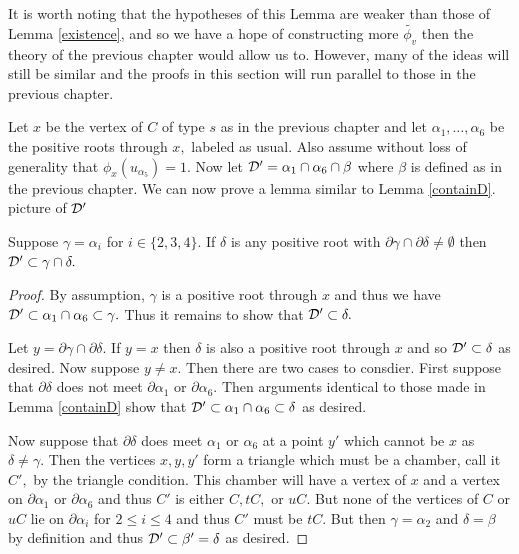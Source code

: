 \documentclass[class=book, crop=false]{standalone}
\begin{document}
It is worth noting that the hypotheses of this Lemma are weaker than those of Lemma \ref{existence}, and so we have a hope of constructing more $\tilde{\phi_v}$ then the theory of the previous chapter would allow us to. However, many of the ideas will still be similar and the proofs in this section will run parallel to those in the previous chapter.

Let $x$ be the vertex of $C$ of type $s$ as in the previous chapter and let $\alpha_1,\dots,\alpha_6$ be the positive roots through $x,$ labeled as usual. Also assume without loss of generality that $\phi_x(u_{\alpha_5})=1.$ Now let $\mathcal{D}'=\alpha_1\cap \alpha_6\cap \beta$ where $\beta$ is defined as in the previous chapter. We can now prove a lemma similar to Lemma \ref{containD}.\\
\Huge picture of $\mathcal{D}'$\normalsize\\

\begin{lemma}
	\label{336f2containD}
	Suppose $\gamma=\alpha_i$ for $i\in \{2,3,4\}.$ If $\delta$ is any positive root with $\partial\gamma\cap \partial\delta\neq \emptyset$ then $\mathcal{D}'\subset \gamma\cap \delta.$
\end{lemma}
\begin{proof}
	By assumption, $\gamma$ is a positive root through $x$ and thus we have $\mathcal{D}'\subset \alpha_1\cap \alpha_6\subset \gamma.$ Thus it remains to show that $\mathcal{D}'\subset \delta.$

	Let $y=\partial\gamma\cap \partial\delta.$ If $y=x$ then $\delta$ is also a positive root through $x$ and so $\mathcal{D}'\subset \delta$ as desired. Now suppose $y\neq x.$ Then there are two cases to consdier. First suppose that $\partial \delta$ does not meet $\partial\alpha_1$ or $\partial\alpha_6.$ Then arguments identical to those made in Lemma \ref{containD} show that $\mathcal{D}'\subset \alpha_1\cap \alpha_6\subset \delta$ as desired.

Now suppose that $\partial\delta$ does meet $\alpha_1$ or $\alpha_6$ at a point $y'$ which cannot be $x$ as $\delta\neq \gamma.$ Then the vertices $x,y,y'$ form a triangle which must be a chamber, call it $C',$ by the triangle condition. This chamber will have a vertex of $x$ and a vertex on $\partial\alpha_1$ or $\partial\alpha_6$ and thus $C'$ is either $C,tC,$ or $uC.$ But none of the vertices of $C$ or $uC$ lie on $\partial\alpha_i$ for $2\le i\le 4$ and thus $C'$ must be $tC.$ But then $\gamma=\alpha_2$ and $\delta=\beta$ by definition and thus $\mathcal{D}'\subset \beta'=\delta$ as desired.
\end{proof}
\end{document}
